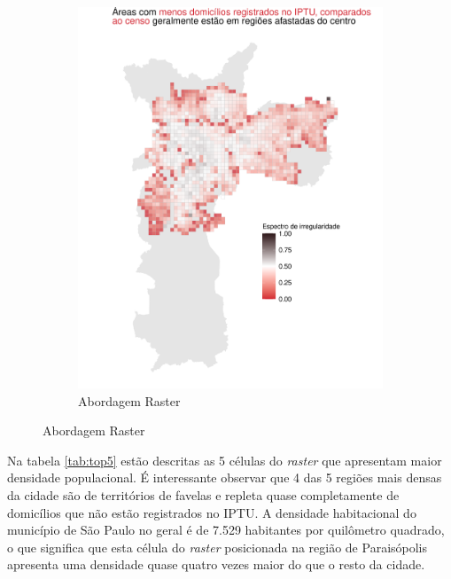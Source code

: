 \begin{figure}[h]
\begin{subfigure}[t]{0.45\linewidth}
        \includegraphics[width = \linewidth]{imagens/balanco_raster.pdf}
        \caption{Abordagem Raster}
        \label{fig:balanco-raster}
    \end{subfigure}
    \label{fig:erros-join}
\end{figure}

Na tabela \ref{tab:top5} estão descritas as 5 células do \textit{raster} que apresentam maior densidade populacional. É interessante observar que 4 das 5 regiões mais densas da cidade são de territórios de favelas e repleta quase completamente de domicílios que não estão registrados no IPTU. A densidade habitacional do município de São Paulo no geral é de 7.529 habitantes por quilômetro quadrado, o que significa que esta célula do \textit{raster} posicionada na região de Paraisópolis apresenta uma densidade quase quatro vezes maior do que o resto da cidade.

\begin{table}[h]
    \caption{Células do \textit{raster} que apresentam a maior densidade populacional}
    
    \label{tab:top5}
    \addtocounter{table}{-1}
\end{table}


